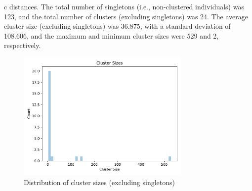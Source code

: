 \documentclass{article}
\begin{document}
c distances. The total number of singletons (i.e., non-clustered individuals) was 123, and the total number of clusters (excluding singletons) was 24. The average cluster size (excluding singletons) was 36.875, with a standard deviation of 108.606, and the maximum and minimum cluster sizes were 529 and 2, respectively.

\begin{figure}[h]
\centering
\includegraphics[width=0.75\textwidth,keepaspectratio]{./figs/cluster_sizes.pdf}
\caption{Distribution of cluster sizes (excluding singletons)}
\end{figure}
\end{document}
